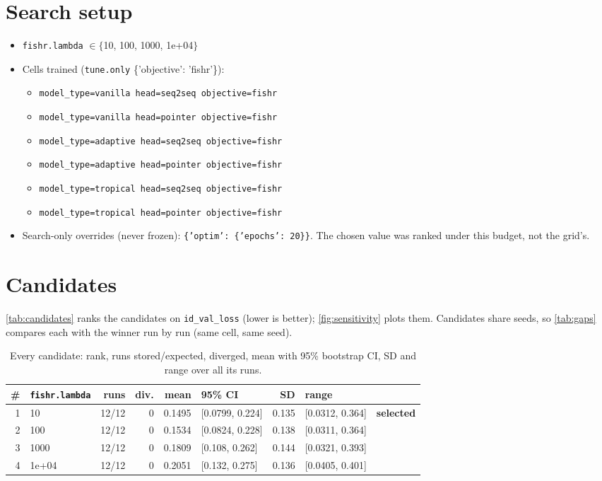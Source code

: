 \documentclass[10pt]{article}
\begin{document}
\section{Search setup}
\begin{itemize}\setlength\itemsep{0pt}
\item \texttt{fishr.lambda} $\in \{$10, 100, 1000, 1e+04$\}$
\item Cells trained (\texttt{tune.only} \{'objective': 'fishr'\}):
\begin{itemize}\setlength\itemsep{0pt}
\item \texttt{model\_type=vanilla head=seq2seq objective=fishr}
\item \texttt{model\_type=vanilla head=pointer objective=fishr}
\item \texttt{model\_type=adaptive head=seq2seq objective=fishr}
\item \texttt{model\_type=adaptive head=pointer objective=fishr}
\item \texttt{model\_type=tropical head=seq2seq objective=fishr}
\item \texttt{model\_type=tropical head=pointer objective=fishr}
\end{itemize}
\item Search-only overrides (never frozen): \texttt{\{'optim': \{'epochs': 20\}\}}. The chosen value was ranked under this budget, not the grid's.
\end{itemize}

\section{Candidates}
\autoref{tab:candidates} ranks the candidates on \texttt{id\_val\_loss} (lower is better); \autoref{fig:sensitivity} plots them.
Candidates share seeds, so \autoref{tab:gaps} compares each with the winner run by run (same cell, same seed).

{\small
\begin{longtable}{rlrrrlrll}
\caption{Every candidate: rank, runs stored/expected, diverged, mean with 95\% bootstrap CI, SD and range over all its runs.}\label{tab:candidates}\\
\toprule
\# & \texttt{fishr.lambda} & runs & div. & mean & 95\% CI & SD & range & \\
\midrule
\endhead
1 & 10 & 12/12 & 0 & 0.1495 & [0.0799, 0.224] & 0.135 & [0.0312, 0.364] & \textbf{selected}\\
2 & 100 & 12/12 & 0 & 0.1534 & [0.0824, 0.228] & 0.138 & [0.0311, 0.364] & \\
3 & 1000 & 12/12 & 0 & 0.1809 & [0.108, 0.262] & 0.144 & [0.0321, 0.393] & \\
4 & 1e+04 & 12/12 & 0 & 0.2051 & [0.132, 0.275] & 0.136 & [0.0405, 0.401] & \\
\bottomrule
\end{longtable}
}
\end{document}
